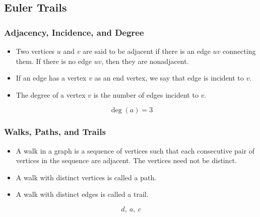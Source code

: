 \documentclass{beamer}
\theoremstyle{Plain}\newtheorem{kt}{Kuratowski's Theorem}
\theoremstyle{Definition}\newtheorem{te}{Tr\'emaux Exploration}
\theoremstyle{Definition}\newtheorem{dfs}{Depth-First Search}
\begin{document}
\subsection{Euler Trails}
\begin{frame}
  \frametitle{Adjacency, Incidence, and Degree}
  \begin{itemize}
    \item Two vertices $u$ and $v$ are said to be \alert{adjacent} if there is an edge $uv$ connecting them. If there is no edge $uv$, then they are nonadjacent.
    \item If an edge has a vertex $v$ as an end vertex, we say that edge is \alert{incident} to $v$.
    \item The \alert{degree} of a vertex $v$ is the number of edges incident to $v$. 
  \end{itemize}
    \begin{figure}[h]
    \begin{equation*}
      \deg{\left( a \right)} = 3
    \end{equation*}
    \end{figure}
\end{frame}

\begin{frame}
  \frametitle{Walks, Paths, and Trails}
  \begin{itemize}
    \item A \alert{walk} in a graph is a sequence of vertices such that each consecutive pair of vertices in the sequence are adjacent. The vertices need not be distinct.
    \item A walk with distinct vertices is called a \alert{path}.
    \item A walk with distinct edges is called a \alert{trail}.
  \end{itemize}
  \begin{figure}[h]
  \begin{equation*}
    d,\ a,\ c
  \end{equation*}
  \end{figure}
\end{frame}
\end{document}
